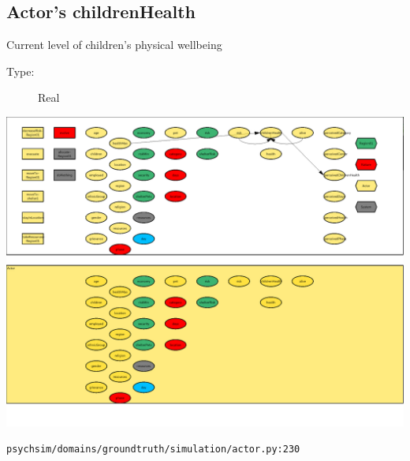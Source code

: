 \documentclass{article}%
\begin{document}
\subsection{Actor's childrenHealth}%
\label{subsec:Actor's childrenHealth}%
Current level of children's physical wellbeing%
\begin{description}%
\item[Type:]%
Real%
\end{description}%
\includegraphics[width=\textwidth]{images/childrenHealthOfActor.png}%
\begin{flushleft}%
\verb|psychsim/domains/groundtruth/simulation/actor.py:230|%
\end{flushleft}%
\end{document}
